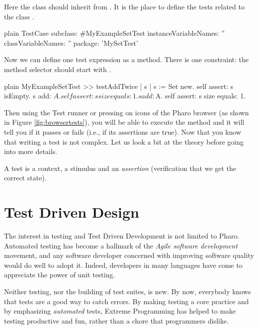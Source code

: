 \documentclass[10pt,twoside,english]{_support/latex/sbabook/sbabook}
\begin{document}
Here the class  should inherit from . It is the place to define the tests
related to the class . 

\begin{displaycode}{plain}
TestCase subclass: #MyExampleSetTest
	instanceVariableNames: ''
	classVariableNames: ''
	package: 'MySetTest'
\end{displaycode}

Now we can define one test expression as a method. There is one constraint: the method selector should start with .

\begin{displaycode}{plain}
MyExampleSetTest >> testAddTwice
	| s |
	s := Set new. 
	self assert: s isEmpty.
	s add: $A.
	self assert: s size equals: 1.
	s add: $A.
	self assert: s size equals: 1.
\end{displaycode}

Then using the Test runner or pressing on icons of the Pharo browser (as shown in Figure \ref{fig:browsertests}), you will be able to execute the method  and it will tell you if it passes or fails (i.e., if its assertions are true). Now that you know that writing a test is not complex. Let us look a bit at the theory before going into more details. 

\begin{coffee}
A test is a context, a stimulus and an \textit{assertion} (verification that we get the correct state).
\end{coffee}
\section{Test Driven Design}
The interest in testing and Test Driven Development is not limited to Pharo.
 Automated testing has become a hallmark of the \textit{Agile software
development} movement, and any software developer concerned with improving
software quality would do well to adopt it. Indeed, developers in many languages
have come to appreciate the power of unit testing.

Neither testing, nor the building of test suites, is new. By now, everybody knows that
tests are a good way to catch errors. By making testing a core practice and by emphasizing \textit{automated} tests, Extreme Programming has helped to make testing
productive and fun, rather than a chore that programmers dislike.
\end{document}
